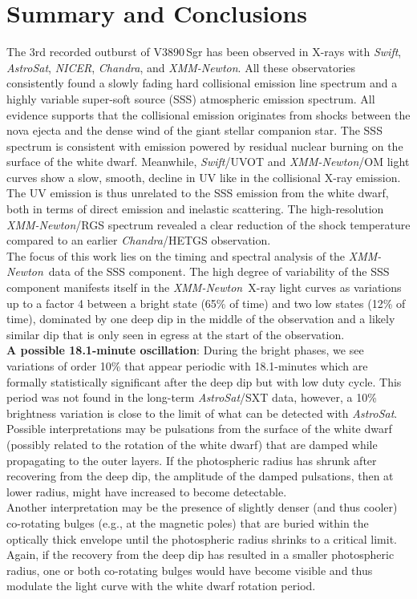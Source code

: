 \documentclass{aa}
\newcommand{\chandra}{{\it Chandra}}
\newcommand{\swift}{{\it Swift}}
\newcommand{\xmm}{{\it XMM-Newton}}
\newcommand{\asat}{{\it AstroSat}}
\newcommand{\nicer}{{\it NICER}}
\begin{document}
\section{Summary and Conclusions}

The 3rd recorded outburst of V3890\,Sgr has been observed in X-rays with
\swift, \asat, \nicer, \chandra, and \xmm. All these observatories consistently
found a slowly fading hard collisional emission line spectrum and a highly
variable super-soft source (SSS) atmospheric emission spectrum. All evidence
supports that the collisional emission originates from shocks between the nova
ejecta and the dense wind of the giant stellar companion star. The SSS
spectrum is consistent with emission powered by residual nuclear burning on
the surface of the white dwarf.
Meanwhile, \swift/UVOT and \xmm/OM light curves show a slow, smooth, decline
in UV like in the collisional X-ray emission. The UV emission is thus
unrelated to the SSS emission from the white dwarf, both in terms of direct
emission and inelastic scattering.
The high-resolution \xmm/RGS spectrum revealed a clear reduction of the
shock temperature compared to an earlier \chandra/HETGS observation.\\

The focus of this work lies on the timing and spectral analysis of the
\xmm\ data of the SSS component. The high degree of variability of the SSS
component manifests itself in the \xmm\ X-ray light curves as variations
up to a factor 4 between a bright state (65\% of time) and two low states
(12\% of time), dominated by one deep dip in the middle of the
observation and a likely similar dip that is only seen in egress at the
start of the observation.\\

{\bf A possible 18.1-minute oscillation}: During the bright phases, we
see variations of order 10\% that appear periodic with 18.1-minutes
which are formally statistically significant after the deep dip but with
low duty cycle. This
period was not found in the long-term \asat/SXT data, however, a 10\%
brightness variation is close to the limit of what can be detected
with \asat.
Possible interpretations may be pulsations from the surface of the white
dwarf (possibly related to the rotation of the white dwarf) that are
damped while propagating to the outer layers. If the photospheric radius
has shrunk after recovering from the deep dip, the amplitude of the
damped pulsations, then at lower radius, might have increased to become
detectable.\\
Another interpretation may be the presence of slightly denser (and thus cooler)
co-rotating bulges (e.g., at the magnetic poles) that are buried within
the optically thick envelope until the photospheric radius shrinks to
a critical limit. Again, if the recovery from the deep dip has resulted
in a smaller photospheric radius, one or both co-rotating bulges would have
become visible and thus modulate the light curve with the white dwarf
rotation period.\\
\end{document}
